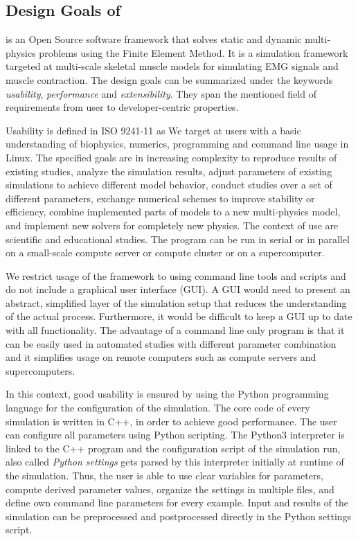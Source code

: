 \subsection{Design Goals of \Opendihu{}}

\Opendihu{} is an Open Source software framework that solves static and dynamic multi-physics problems using the Finite Element Method. It is a simulation framework targeted at multi-scale skeletal muscle models for simulating EMG signals and muscle contraction. 
The design goals can be summarized under the keywords \emph{usability}, \emph{performance} and \emph{extensibility}. They span the mentioned field of requirements from user to developer-centric properties.

Usability is defined in ISO 9241-11 \cite{ISO9241} as   We target at users with a basic understanding of biophysics, numerics, programming and command line usage in Linux. The specified goals are in increasing complexity to reproduce results of existing studies,  analyze the simulation results,  adjust parameters of existing simulations to achieve different model behavior, conduct studies over a set of different parameters,  exchange numerical schemes to improve stability or efficiency, combine implemented parts of models to a new multi-physics model, and implement new solvers for completely new physics. The context of use are scientific and educational studies. The program can be run in serial or in parallel on a small-scale compute server or compute cluster or on a supercomputer.

We restrict usage of the framework to using command line tools and scripts and do not include a graphical user interface (GUI). A GUI would need to present an abstract, simplified layer of the simulation setup that reduces the understanding of the actual process. Furthermore, it would be difficult to keep a GUI up to date with all functionality. The advantage of a command line only program is that it can be easily used in automated studies with different parameter combination and it simplifies usage on remote computers such as compute servers and supercomputers. 

In this context, good usability is ensured by using the Python programming language for the configuration of the simulation.
The core code of every simulation is written in C++, in order to achieve good performance. The user can configure all parameters using Python scripting. The Python3 interpreter is linked to the C++ program and the configuration script of the simulation run, also called \emph{Python settings} gets parsed by this interpreter initially at runtime of the simulation. Thus, the user is able to use clear variables for parameters, compute derived parameter values, organize the settings in multiple files, and define own command line parameters for every example. Input and results of the simulation can be preprocessed and postprocessed directly in the Python settings script.

